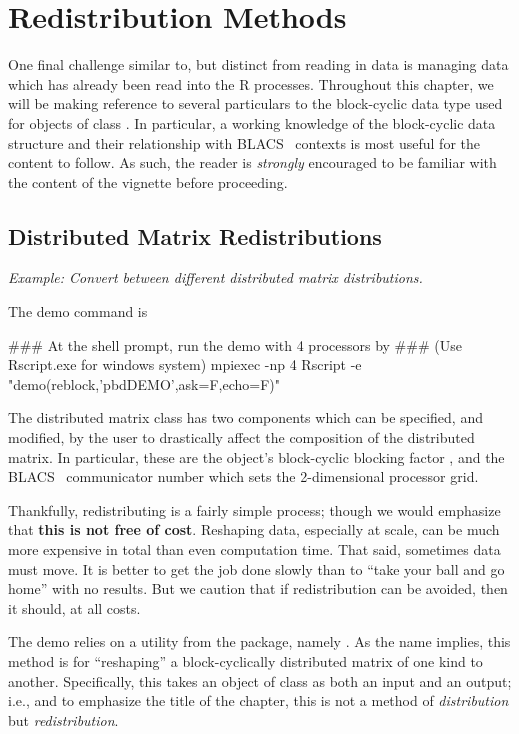 \chapter{Redistribution Methods}
\label{sec:redist}

One final challenge similar to, but distinct from reading in data is managing data which has already been read into the R processes.  Throughout this chapter, we will be making reference to several particulars to the block-cyclic data type used for objects of
class .
In particular, a working knowledge of the block-cyclic data structure and their relationship with BLACS~ contexts is most useful for the content to follow.  As such, the reader is \emph{strongly} encouraged to be familiar with the content of the  vignette before proceeding.

\section{Distributed Matrix Redistributions}
\label{sec:dmatredist}

\emph{Example:  Convert between different distributed matrix distributions.}

The demo command is
\begin{Command}
### At the shell prompt, run the demo with 4 processors by
### (Use Rscript.exe for windows system)
mpiexec -np 4 Rscript -e "demo(reblock,'pbdDEMO',ask=F,echo=F)"
\end{Command}

The distributed matrix class 
has two components which can be specified, and modified, by the user to drastically affect the composition of the distributed matrix.  In particular, these are the object's block-cyclic blocking factor , and the BLACS~ communicator number  which sets the 2-dimensional processor grid.  

Thankfully, redistributing is a fairly simple process; though we would emphasize that \textbf{this is not free of cost}.  Reshaping data, especially at scale, can be much more expensive in total than even computation time.  That said, sometimes data must move.  It is better to get the job done slowly than to ``take your ball and go home'' with no results.  But we caution that if redistribution can be avoided, then it should, at all costs.

The demo relies on a utility from the  package, namely .  As the name implies, this method is for ``reshaping'' a block-cyclically distributed matrix of one kind to another.  Specifically, this takes an object of
class 
as both an input and an output; i.e., and to emphasize the title of the chapter, this is not a method of \emph{distribution} but \emph{redistribution}.

